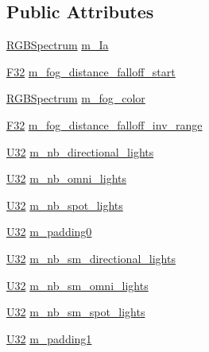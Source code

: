 \subsection*{Public Attributes}
\begin{DoxyCompactItemize}
\item 
\hyperlink{structmage_1_1_r_g_b_spectrum}{R\+G\+B\+Spectrum} \hyperlink{structmage_1_1_light_buffer_a1053a31ecdfdec2d4703376152f6defc}{m\+\_\+\+Ia}
\item 
\hyperlink{namespacemage_aa97e833b45f06d60a0a9c4fc22ae02c0}{F32} \hyperlink{structmage_1_1_light_buffer_a989291bc9195e0bc7606cecf4c56f17a}{m\+\_\+fog\+\_\+distance\+\_\+falloff\+\_\+start}
\item 
\hyperlink{structmage_1_1_r_g_b_spectrum}{R\+G\+B\+Spectrum} \hyperlink{structmage_1_1_light_buffer_aa33b98b2880c519eb5be09f78ce4581e}{m\+\_\+fog\+\_\+color}
\item 
\hyperlink{namespacemage_aa97e833b45f06d60a0a9c4fc22ae02c0}{F32} \hyperlink{structmage_1_1_light_buffer_a224b5927ab16935d36e86212e9e9ec4f}{m\+\_\+fog\+\_\+distance\+\_\+falloff\+\_\+inv\+\_\+range}
\item 
\hyperlink{namespacemage_a41c104c036fba3756a74e19f793eeaa1}{U32} \hyperlink{structmage_1_1_light_buffer_a099a0307b0feacddcf01921f97752307}{m\+\_\+nb\+\_\+directional\+\_\+lights}
\item 
\hyperlink{namespacemage_a41c104c036fba3756a74e19f793eeaa1}{U32} \hyperlink{structmage_1_1_light_buffer_ad576a2cf65d5c84761812144274ac779}{m\+\_\+nb\+\_\+omni\+\_\+lights}
\item 
\hyperlink{namespacemage_a41c104c036fba3756a74e19f793eeaa1}{U32} \hyperlink{structmage_1_1_light_buffer_a33b37a8de8ebd92ad4911d68e836f79f}{m\+\_\+nb\+\_\+spot\+\_\+lights}
\item 
\hyperlink{namespacemage_a41c104c036fba3756a74e19f793eeaa1}{U32} \hyperlink{structmage_1_1_light_buffer_a047221bb9ffc7e782c8865be1d39d568}{m\+\_\+padding0}
\item 
\hyperlink{namespacemage_a41c104c036fba3756a74e19f793eeaa1}{U32} \hyperlink{structmage_1_1_light_buffer_a3f2bee584a95ff4e41a02558c45bba94}{m\+\_\+nb\+\_\+sm\+\_\+directional\+\_\+lights}
\item 
\hyperlink{namespacemage_a41c104c036fba3756a74e19f793eeaa1}{U32} \hyperlink{structmage_1_1_light_buffer_afef9d26eab5ebc74272c23b208f1ba0a}{m\+\_\+nb\+\_\+sm\+\_\+omni\+\_\+lights}
\item 
\hyperlink{namespacemage_a41c104c036fba3756a74e19f793eeaa1}{U32} \hyperlink{structmage_1_1_light_buffer_a12ef0995fa34d6d132402ff5ab651b9b}{m\+\_\+nb\+\_\+sm\+\_\+spot\+\_\+lights}
\item 
\hyperlink{namespacemage_a41c104c036fba3756a74e19f793eeaa1}{U32} \hyperlink{structmage_1_1_light_buffer_ac300e3454170680db1e290537fbf4a11}{m\+\_\+padding1}
\end{DoxyCompactItemize}
